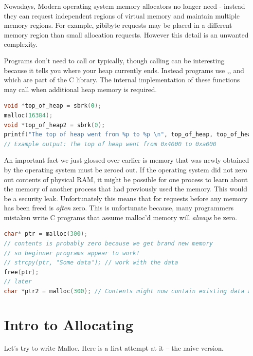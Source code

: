 Nowadays, Modern operating system memory allocators no longer need  - instead they can request independent regions of virtual memory and maintain multiple memory regions.
For example, gibibyte requests may be placed in a different memory region than small allocation requests.
However this detail is an unwanted complexity.

Programs don't need to call  or  typically, though calling  can be interesting because it tells you where your heap currently ends.
Instead programs use ,, and  which are part of the C library.
The internal implementation of these functions may call  when additional heap memory is required.

\begin{lstlisting}[language=C]
void *top_of_heap = sbrk(0);
malloc(16384);
void *top_of_heap2 = sbrk(0);
printf("The top of heap went from %p to %p \n", top_of_heap, top_of_heap2);
// Example output: The top of heap went from 0x4000 to 0xa000
\end{lstlisting}

An important fact we just glossed over earlier is memory that was newly obtained by the operating system must be zeroed out.
If the operating system did not zero out contents of physical RAM, it might be possible for one process to learn about the memory of another process that had previously used the memory.
This would be a security leak.
Unfortunately this means that for  requests before any memory has been freed is \emph{often} zero.
This is unfortunate because, many programmers mistaken write C programs that assume malloc'd memory will \emph{always} be zero.

\begin{lstlisting}[language=C]
char* ptr = malloc(300);
// contents is probably zero because we get brand new memory
// so beginner programs appear to work!
// strcpy(ptr, "Some data"); // work with the data
free(ptr);
// later
char *ptr2 = malloc(300); // Contents might now contain existing data and is probably not zero
\end{lstlisting}

\section{Intro to Allocating}

Let's try to write Malloc.
Here is a first attempt at it -- the naive version.


